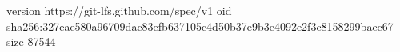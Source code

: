 version https://git-lfs.github.com/spec/v1
oid sha256:327eae580a96709dac83efb637105c4d50b37e9b3e4092e2f3c8158299baec67
size 87544
